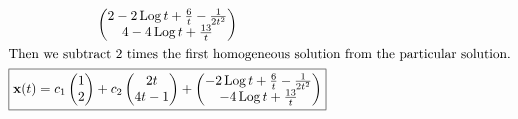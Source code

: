 \begin{Example}
\begin{gather*}
\begin{pmatrix}
      2 - 2 \mathop{\mathrm{Log}}\nolimits t + \frac{6}{t} - \frac{1}{2 t^2} \\
      4 - 4 \mathop{\mathrm{Log}}\nolimits t + \frac{13}{t}
    \end{pmatrix} \\
    \intertext{Then we subtract 2 times the first homogeneous solution from 
      the particular solution.}
    \boxed{
      \mathbf{x}(t) = 
      c_1 \begin{pmatrix} 1 \\ 2 \end{pmatrix}
      + c_2 \begin{pmatrix} 2 t \\ 4 t - 1 \end{pmatrix}
      + 
      \begin{pmatrix}
        - 2 \mathop{\mathrm{Log}}\nolimits t + \frac{6}{t} - \frac{1}{2 t^2} \\
        - 4 \mathop{\mathrm{Log}}\nolimits t + \frac{13}{t}
      \end{pmatrix}
      }
  \end{gather*}
\end{Example}






